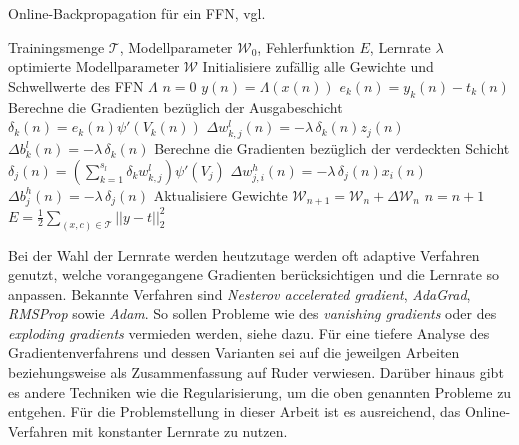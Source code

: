 \begin{algorithm}
    \caption{Online-Backpropagation für ein FFN, vgl. \cite{du_diss}}
    \label{alg:online_backprop}
    \begin{algorithmic}
    \Require  Trainingsmenge $\mathcal{T}$, Modellparameter $\mathcal{W}_0$, Fehlerfunktion $E$, Lernrate $\lambda$ 
    \Ensure $\text{optimierte Modellparameter} \; \mathcal{W}$
    \State Initialisiere zufällig alle Gewichte und Schwellwerte des FFN $\Lambda$ 
    \State $n=0$  
     
        \State $y(n)=\Lambda(x(n))$
        \State $e_k(n)=y_k(n)-t_k(n)$
        \State Berechne die Gradienten bezüglich der Ausgabeschicht
        \State $\delta_k(n)= e_k(n) \psi'(V_k(n))$
        \State $\Delta w_{k,j}^l(n)= -\lambda \, \delta_k(n) z_j(n)$
        \State $\Delta b_{k}^l(n)= -\lambda \, \delta_k(n)$
        \State Berechne die Gradienten bezüglich der verdeckten Schicht
        \State $\delta_j(n)= \left(\sum_{k=1}^{s_l} \delta_k w_{k,j}^l\right) \psi'(V_j)$
        \State $\Delta w_{j,i}^h(n)= -\lambda \, \delta_j(n) x_i(n)$
        \State $\Delta b_{j}^h(n)= -\lambda \, \delta_j(n)$
        \State Aktualisiere Gewichte 
        \State $\mathcal{W}_{n+1}= \mathcal{W}_n + \Delta \mathcal{W}_n$
        \State $n=n+1$
    \EndFor
    \State $E=\frac{1}{2} \sum_{(x,c) \in \mathcal{T}} ||y-t||_2^2$
    \EndWhile
    \end{algorithmic}
\end{algorithm}


Bei der Wahl der Lernrate werden heutzutage werden oft adaptive Verfahren genutzt, welche vorangegangene Gradienten berücksichtigen und die Lernrate so anpassen. Bekannte Verfahren sind \textit{Nesterov accelerated
gradient}\cite{sutskever2013importance}, \textit{AdaGrad}\cite{duchi2011adaptive}, \textit{RMSProp}\cite{tieleman2012lecture} sowie \textit{Adam}\cite{Kingma2015AdamAM}. So sollen Probleme wie des \textit{vanishing gradients} oder des \textit{exploding gradients} vermieden werden, siehe dazu\cite{hanin2018neural}.
Für eine tiefere Analyse des Gradientenverfahrens und dessen Varianten sei auf die jeweilgen Arbeiten beziehungsweise als Zusammenfassung auf Ruder\cite{ruder2016overview,} verwiesen. Darüber hinaus gibt es andere Techniken wie die Regularisierung, um die oben genannten Probleme zu entgehen.
Für die Problemstellung in dieser Arbeit ist es ausreichend, das Online-Verfahren mit konstanter Lernrate zu nutzen. 

